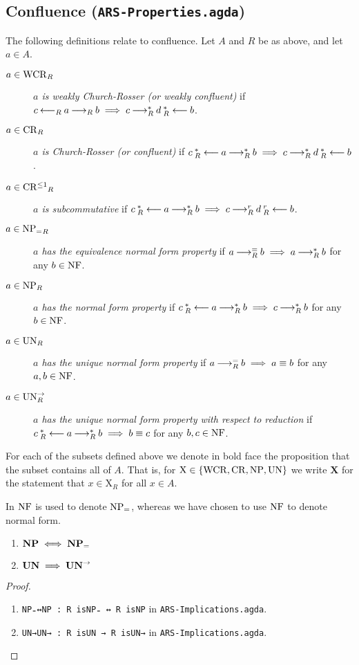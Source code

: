 \subsection{Confluence (\texttt{ARS-Properties.agda})}
\begin{definition} The following definitions relate to confluence. Let $A$ and $R$ be as above, and let $a \in A$.
    \begin{description}
        \item[$a \in \mathrm{WCR}_R$] \emph{$a$ is weakly Church-Rosser (or weakly confluent)} if $c \mathbin{\longleftarrow_R} a \mathbin{\longrightarrow_R} b \implies c \mathbin{\longrightarrow_R^*} d \mathbin{_R^*\longleftarrow} b$.
        \item[$a \in \mathrm{CR}_R$] \emph{$a$ is Church-Rosser (or confluent)} if $c \mathbin{_R^*\longleftarrow} a \mathbin{\longrightarrow_R^*} b \implies c \mathbin{\longrightarrow_R^*} d \mathbin{_R^*\longleftarrow} b$.
        \item[$a \in \mathrm{CR^{\le 1}}_R$] \emph{$a$ is subcommutative} if $c \mathbin{_R^*\longleftarrow} a \mathbin{\longrightarrow_R^*} b \implies c \mathbin{\longrightarrow_R^r} d \mathbin{_R^r\longleftarrow} b$.
        \item[$a \in \mathrm{NP_=}_R$] \emph{$a$ has the equivalence normal form property} if $a \mathbin{\longrightarrow_R^=} b \implies a\mathbin{\longrightarrow_R^*} b$ for any $b \in \mathrm{NF}$.
        \item[$a \in \mathrm{NP}_R$] \emph{$a$ has the normal form property} if $c \mathbin{_R^*\longleftarrow} a \mathbin{\longrightarrow_R^*} b \implies c \mathbin{\longrightarrow_R^*} b$ for any $b \in \mathrm{NF}$. 
        \item[$a \in \mathrm{UN}_R$] \emph{$a$ has the unique normal form property} if $a \mathbin{\longrightarrow_R^=} b \implies a \equiv b$  for any $a, b \in \mathrm{NF}$.
        \item[$a \in \mathrm{UN}^{\to}_R$] \emph{$a$ has the unique normal form property with respect to reduction} if $c \mathbin{_R^*\longleftarrow} a \mathbin{\longrightarrow_R^*} b  \implies b \equiv c$  for any $b, c \in \mathrm{NF}$.
    \end{description}
\end{definition}
For each of the subsets defined above we denote in bold face the proposition that the subset contains all of $A$.
That is, for $\mathrm{X} \in \{\mathrm{WCR} , \mathrm{CR} , \mathrm{NP} , \mathrm{UN} \}$ we write $\mathbf{X}$ for the statement that $x \in \mathrm{X}_R$ for all $x \in A$.


In \terese $\mathrm{NF}$ is used to denote $\mathrm{NP_=}$, whereas we have chosen to use $\mathrm{NF}$ to denote normal form. 

\begin{proposition}\hfill 
    \begin{enumerate}
        \item $\mathbf{NP} \iff \mathbf{NP_=}$ 
        \item $\mathbf{UN} \implies \mathbf{UN}^{\to}$
    \end{enumerate}
\end{proposition}
\begin{proof} \hfill
    \begin{enumerate}
        \item \verb|NP₌↔NP : R isNP₌ ↔ R isNP| in \texttt{ARS-Implications.agda}.
        \item \verb|UN→UN→ : R isUN → R isUN→| in \texttt{ARS-Implications.agda}. 
    \end{enumerate} 
\end{proof}

